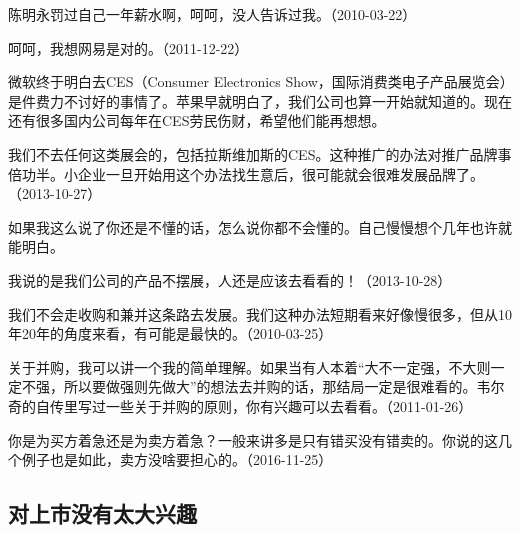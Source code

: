 陈明永罚过自己一年薪水啊，呵呵，没人告诉过我。（2010-03-22）




呵呵，我想网易是对的。（2011-12-22）

微软终于明白去CES（Consumer Electronics Show，国际消费类电子产品展览会）是件费力不讨好的事情了。苹果早就明白了，我们公司也算一开始就知道的。现在还有很多国内公司每年在CES劳民伤财，希望他们能再想想。


我们不去任何这类展会的，包括拉斯维加斯的CES。这种推广的办法对推广品牌事倍功半。小企业一旦开始用这个办法找生意后，很可能就会很难发展品牌了。（2013-10-27）


如果我这么说了你还是不懂的话，怎么说你都不会懂的。自己慢慢想个几年也许就能明白。

我说的是我们公司的产品不摆展，人还是应该去看看的！（2013-10-28）


我们不会走收购和兼并这条路去发展。我们这种办法短期看来好像慢很多，但从10年20年的角度来看，有可能是最快的。（2010-03-25）


关于并购，我可以讲一个我的简单理解。如果当有人本着“大不一定强，不大则一定不强，所以要做强则先做大”的想法去并购的话，那结局一定是很难看的。韦尔奇的自传里写过一些关于并购的原则，你有兴趣可以去看看。（2011-01-26）


你是为买方着急还是为卖方着急？一般来讲多是只有错买没有错卖的。你说的这几个例子也是如此，卖方没啥要担心的。（2016-11-25）

\subsection{对上市没有太大兴趣}

